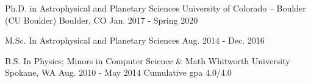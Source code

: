 

\begin{cventries}

  \cventry
    {Ph.D. in Astrophysical and Planetary Sciences} 
    {University of Colorado -- Boulder (CU Boulder)} %
    {Boulder, CO} %
    {Jan. 2017 - Spring 2020} %
    {}
 	
	\vspace{-0.225in}
  \cventry
    {M.Sc. In Astrophysical and Planetary Sciences} %
    {} %
    {} %
    {Aug. 2014 - Dec. 2016} %
    {}

    \vspace{-0.15in}

  \cventry
    {B.S. In Physics; Minors in Computer Science \& Math }
    {Whitworth University}
    {Spokane, WA}
    {Aug. 2010 - May 2014}
    {Cumulative gpa 4.0/4.0}
    \vspace{-0.15in}

\end{cventries}
